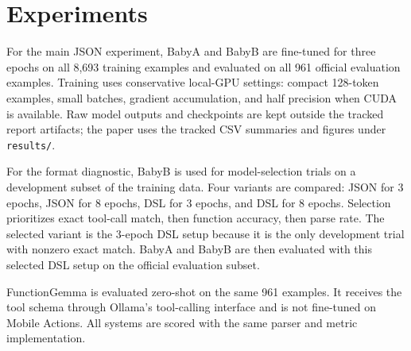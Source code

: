 \section{Experiments}

For the main JSON experiment, BabyA and BabyB are fine-tuned for three epochs on all 8,693 training examples and evaluated on all 961 official evaluation examples. Training uses conservative local-GPU settings: compact 128-token examples, small batches, gradient accumulation, and half precision when CUDA is available. Raw model outputs and checkpoints are kept outside the tracked report artifacts; the paper uses the tracked CSV summaries and figures under \texttt{results/}.

For the format diagnostic, BabyB is used for model-selection trials on a development subset of the training data. Four variants are compared: JSON for 3 epochs, JSON for 8 epochs, DSL for 3 epochs, and DSL for 8 epochs. Selection prioritizes exact tool-call match, then function accuracy, then parse rate. The selected variant is the 3-epoch DSL setup because it is the only development trial with nonzero exact match. BabyA and BabyB are then evaluated with this selected DSL setup on the official evaluation subset.

FunctionGemma is evaluated zero-shot on the same 961 examples. It receives the tool schema through Ollama's tool-calling interface and is not fine-tuned on Mobile Actions. All systems are scored with the same parser and metric implementation.
